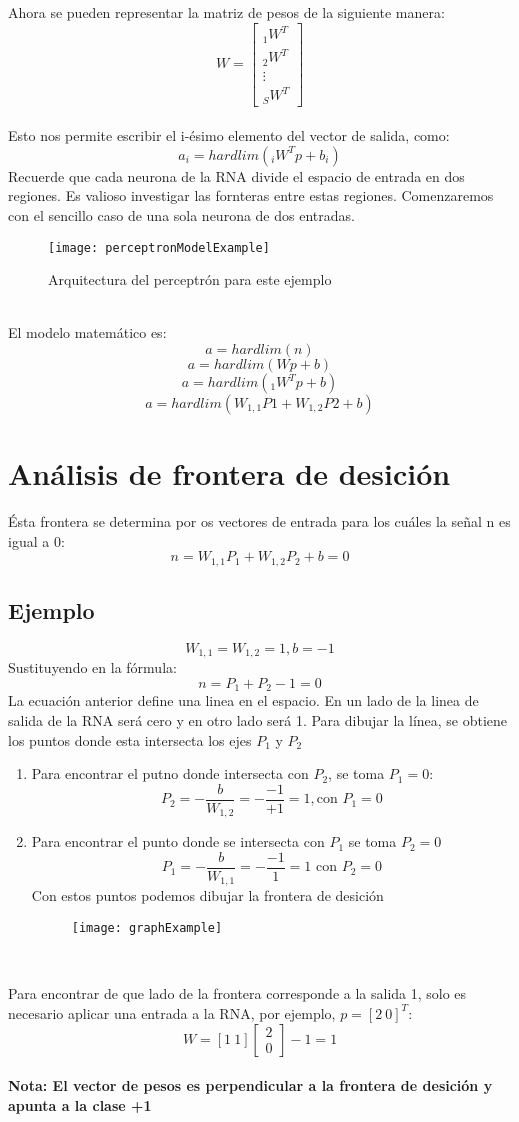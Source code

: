 \documentclass{article}
\begin{document}
Ahora se pueden representar la matriz de pesos de la siguiente manera:
\[W=
\begin{bmatrix}
	_1W^T\\
	_2W^T\\
	\vdots\\
	_SW^T
	\end{bmatrix}
\]\\
Esto nos permite escribir el i-ésimo elemento del  vector de salida, como:\\
$$ a_i = hardlim(_iW^Tp + b_i) $$
Recuerde que cada neurona de la RNA divide el espacio de entrada en dos regiones. Es valioso investigar las fornteras entre estas regiones. Comenzaremos con el sencillo caso de una sola neurona de dos entradas.\\
\begin{figure}[h!]
	\caption{Arquitectura del perceptrón para este ejemplo}
	\centering
	\texttt{[image: perceptronModelExample]}
\end{figure}\\
El modelo matemático es:
$$a = hardlim(n)$$
$$a = hardlim(Wp + b)$$
$$a = hardlim(_1W^Tp + b)$$
$$a = hardlim(W_{1,1}P1 + W_{1,2}P2 + b)$$
\section{Análisis de frontera de desición}
Ésta frontera se determina por os vectores de entrada para los cuáles la señal n es igual a 0:
$$ n = W_{1,1}P_1 + W_{1,2}P_2 + b = 0 $$
\subsection{Ejemplo}
$$ W_{1,1} = W_{1,2} = 1, b=-1$$
Sustituyendo en la fórmula:
$$ n = P_1 + P_2 -1 = 0 $$
La ecuación anterior define una linea en el espacio. En un lado de la linea de salida de la RNA será cero y en otro lado será 1. Para dibujar la línea, se obtiene los puntos donde esta intersecta los ejes $P_1$ y $P_2$ 
\begin{enumerate}
	\item Para encontrar el putno donde intersecta con $P_2$, se toma $P_1 = 0$:\\
	$$ P_2 = -\frac{b}{W_{1,2}} = -\frac{-1}{+1} = 1, \text{con } P_1=0$$
	\newpage
	\item Para encontrar el punto donde se intersecta con $P_1$ se toma $P_2 = 0$
	$$ P_1 = -\frac{b}{W_{1,1}}=-\frac{-1}{1}=1 \text{ con } P_2 = 0$$
	Con estos puntos podemos dibujar la frontera de desición
	\begin{figure}[h!]
		\centering
		\texttt{[image: graphExample]}
	\end{figure}\\
\end{enumerate}
Para encontrar de que lado de la frontera corresponde a la salida 1, solo es necesario aplicar una entrada a la RNA, por ejemplo, $p=[2 \ 0]^T$:
\[W=
	[1\ 1]
	\begin{bmatrix}
	2\\
	0
	\end{bmatrix} -1 = 1
\]\\
\textbf{Nota: El vector de pesos es perpendicular a la frontera de desición y apunta a la clase +1}
\end{document}
